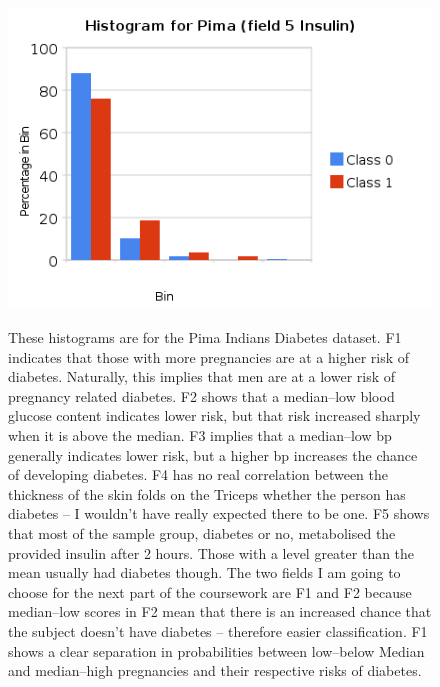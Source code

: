 \documentclass[a4paper,10pt]{article}
\begin{document}
        \begin{figure}[ht!]
          \begin{minipage}[t]{0.5\linewidth}
              \includegraphics[scale=0.45]{charts/PimaPics/P5.png}
          \end{minipage}
          \parbox[b]{3.5in}{
             These histograms are for the Pima Indians Diabetes dataset. F1 indicates that those with more
             pregnancies are at a higher risk of diabetes. Naturally, this implies that men are at a lower risk
             of pregnancy related diabetes. F2 shows that a median--low blood glucose content indicates lower 
             risk, but that risk increased sharply when it is above the median. F3 implies that a median--low bp             
             generally indicates lower risk, but a higher bp increases the chance of developing diabetes. F4 has 
             no real correlation between the thickness of the skin folds on the Triceps whether the person has diabetes --
             I wouldn't have really expected there to be one. F5 shows that most of the sample group, diabetes or no,
             metabolised the provided insulin after 2 hours. Those with a level greater than the mean usually had
             diabetes though. The two fields I am going to choose for the next part of the coursework are F1 and F2
             because median--low scores in F2 mean that there is an increased chance that the subject doesn't have
             diabetes -- therefore easier classification. F1 shows a clear separation in probabilities between
             low--below Median and median--high pregnancies and their respective risks of diabetes.     
          }
        \end{figure}
\end{document}
